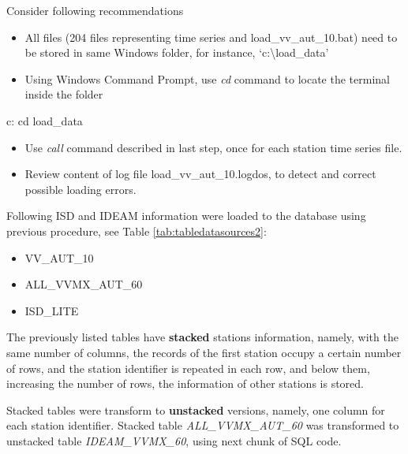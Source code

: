 \documentclass[12pt,twoside]{reedthesis}
\newenvironment{Shaded}{\begin{snugshade}}{\end{snugshade}}
\newcommand{\BuiltInTok}[1]{#1}
\newcommand{\ExtensionTok}[1]{#1}
\newcommand{\NormalTok}[1]{#1}
\providecommand{\tightlist}{%
  \setlength{\itemsep}{0pt}\setlength{\parskip}{0pt}}
\begin{document}
Consider following recommendations
\begin{itemize}
\tightlist
\item
  All files (204 files representing time series and load\_vv\_aut\_10.bat) need to be stored in same Windows folder, for instance, `c:\textbackslash load\_data'
\item
  Using Windows Command Prompt, use \emph{cd} command to locate the terminal inside the folder
\end{itemize}
\scriptsize

\vspace{0.4cm}
\begin{Shaded}
\begin{Highlighting}[]
        \ExtensionTok{c}\NormalTok{:}
        \BuiltInTok{cd}\NormalTok{ load_data}
\end{Highlighting}
\end{Shaded}
\normalsize
\begin{itemize}
\tightlist
\item
  Use \emph{call} command described in last step, once for each station time series file.
\item
  Review content of log file load\_vv\_aut\_10.logdos, to detect and correct possible loading errors.
\end{itemize}
Following ISD and IDEAM information were loaded to the database using previous procedure, see Table \ref{tab:tabledatasources2}:
\begin{itemize}
\tightlist
\item
  VV\_AUT\_10
\item
  ALL\_VVMX\_AUT\_60
\item
  ISD\_LITE
\end{itemize}
The previously listed tables have \textbf{stacked} stations information, namely, with the same number of columns, the records of the first station occupy a certain number of rows, and the station identifier is repeated in each row, and below them, increasing the number of rows, the information of other stations is stored.

Stacked tables were transform to \textbf{unstacked} versions, namely, one column for each station identifier. Stacked table \emph{ALL\_VVMX\_AUT\_60} was transformed to unstacked table \emph{IDEAM\_VVMX\_60}, using next chunk of SQL code.

\scriptsize
\end{document}
